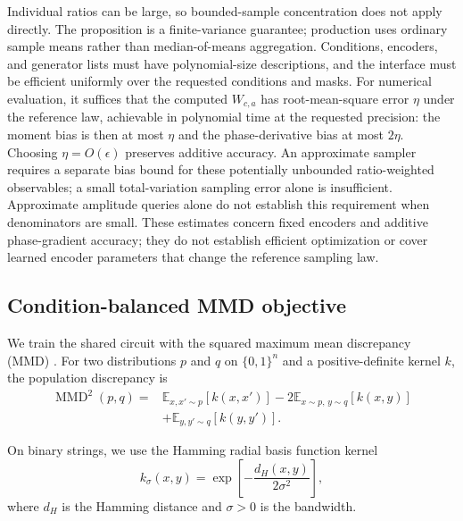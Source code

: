 \documentclass[pra,aps,10pt,twocolumn,floatfix,superscriptaddress,
notitlepage,longbibliography]{revtex4-2}
\newcommand{\bits}{\{0,1\}}
\newcommand{\E}{\mathbb{E}}
\newcommand{\mmd}{\operatorname{MMD}}
\begin{document}
Individual ratios can be large, so bounded-sample concentration does not apply directly. The proposition is a finite-variance guarantee; production uses ordinary sample means rather than median-of-means aggregation. Conditions, encoders, and generator lists must have polynomial-size descriptions, and the interface must be efficient uniformly over the requested conditions and masks. For numerical evaluation, it suffices that the computed $W_{c,a}$ has root-mean-square error $\eta$ under the reference law, achievable in polynomial time at the requested precision: the moment bias is then at most $\eta$ and the phase-derivative bias at most $2\eta$. Choosing $\eta=O(\epsilon)$ preserves additive accuracy. An approximate sampler requires a separate bias bound for these potentially unbounded ratio-weighted observables; a small total-variation sampling error alone is insufficient. Approximate amplitude queries alone do not establish this requirement when denominators are small. These estimates concern fixed encoders and additive phase-gradient accuracy; they do not establish efficient optimization or cover learned encoder parameters that change the reference sampling law.

\subsection{Condition-balanced MMD objective}

We train the shared circuit with the squared maximum mean discrepancy (MMD) \cite{grettonKernelTwoSample2012}. For two distributions $p$ and $q$ on $\bits^n$ and a positive-definite kernel $k$, the population discrepancy is
\begin{equation}
\begin{aligned}
\mmd^2(p,q)={}&\E_{x,x'\sim p}[k(x,x')]
  -2\E_{x\sim p,\,y\sim q}[k(x,y)]\\
  &+\E_{y,y'\sim q}[k(y,y')].
\end{aligned}
\label{eq:mmd-population}
\end{equation}

On binary strings, we use the Hamming radial basis function kernel
\begin{equation}
    k_\sigma(x,y)=\exp\!\left[-\frac{d_H(x,y)}{2\sigma^2}\right],
    \label{eq:hamming-rbf-kernel}
\end{equation}
where $d_H$ is the Hamming distance and $\sigma>0$ is the bandwidth.
\end{document}
